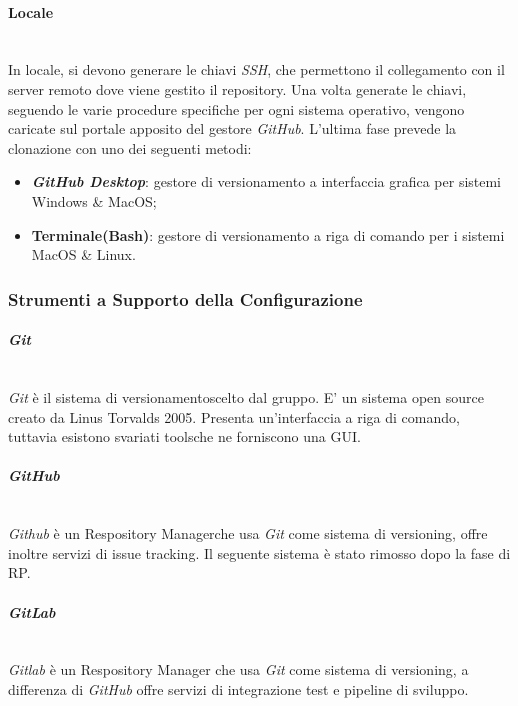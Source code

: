 \paragraph{Locale} \-\\
	In locale, si devono generare le chiavi \textit{SSH}, che permettono il collegamento con il server remoto dove viene gestito il repository.
	Una volta generate le chiavi, seguendo le varie procedure specifiche per ogni sistema operativo, vengono caricate sul portale apposito del gestore \textit{GitHub}.
	L'ultima fase prevede la clonazione con uno dei seguenti metodi:

	\begin{itemize}
		\item \textbf{\textit{GitHub Desktop}}: gestore di versionamento a interfaccia grafica per sistemi Windows \& MacOS;
		\item \textbf{Terminale(Bash)}: gestore di versionamento a riga di comando per i sistemi MacOS \& Linux.
	\end{itemize}
	
	
\subsubsection{Strumenti a Supporto della Configurazione}\label{StrumentiVersioning}
	
\paragraph{\textit{Git}} ~\\
	\textit{Git} è il sistema di versionamento\glossario scelto dal gruppo. E' un sistema open source creato da Linus 	Torvalds 2005. Presenta un'interfaccia a riga di comando, tuttavia esistono svariati tools\glossario 	che 	ne forniscono una GUI.

\paragraph{\textit{GitHub}} ~\\
	\textit{Github} è un Respository Manager\glossario che usa \textit{Git} come sistema di versioning, offre inoltre 	servizi di issue tracking\glossario. Il seguente sistema è stato rimosso dopo la fase di RP.
	
\paragraph{\textit{GitLab}} \-\\
	\textit{Gitlab} è un Respository Manager che usa \textit{Git} come sistema di versioning, a differenza di \textit{GitHub} offre servizi di integrazione test e pipeline di sviluppo. 


